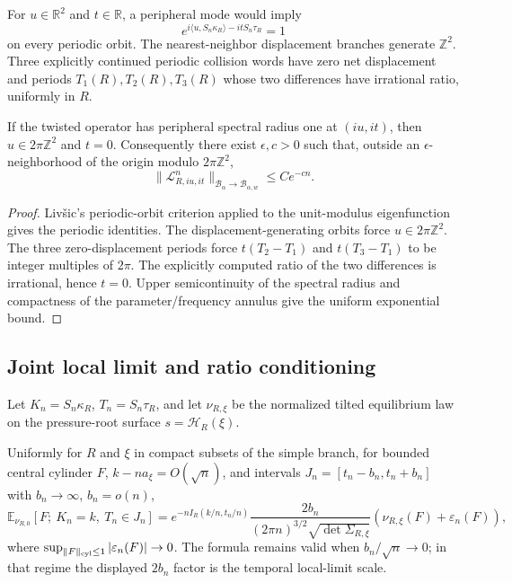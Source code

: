 For \(u\in\mathbb R^2\) and \(t\in\mathbb R\), a peripheral mode would imply
\[
 e^{i\langle u,S_n\kappa_R\rangle-itS_n\tau_R}=1
\]
on every periodic orbit.  The nearest-neighbor displacement branches generate
\(\mathbb Z^2\).  Three explicitly continued periodic collision words have
zero net displacement and periods \(T_1(R),T_2(R),T_3(R)\) whose two
differences have irrational ratio, uniformly in \(R\).

\begin{lemma}
\label{lem:rr2-a2-aperiodic}
If the twisted operator has peripheral spectral radius one at \((iu,it)\),
then \(u\in2\pi\mathbb Z^2\) and \(t=0\).  Consequently there exist
\(\epsilon,c>0\) such that, outside an \(\epsilon\)-neighborhood of the
origin modulo \(2\pi\mathbb Z^2\),
\[
 \|\mathcal L_{R,iu,it}^n\|_{\mathcal B_\alpha\to\mathcal B_{\alpha,w}}
 \le Ce^{-cn}.
\]
\end{lemma}

\begin{proof}
Liv\v{s}ic's periodic-orbit criterion applied to the unit-modulus
eigenfunction gives the periodic identities.  The displacement-generating
orbits force \(u\in2\pi\mathbb Z^2\).  The three zero-displacement periods
force \(t(T_2-T_1)\) and \(t(T_3-T_1)\) to be integer multiples of \(2\pi\).
The explicitly computed ratio of the two differences is irrational, hence
\(t=0\).  Upper semicontinuity of the spectral radius and compactness of the
parameter/frequency annulus give the uniform exponential bound.
\end{proof}

\subsection{Joint local limit and ratio conditioning}

Let \(K_n=S_n\kappa_R\), \(T_n=S_n\tau_R\), and let
\(\nu_{R,\xi}\) be the normalized tilted equilibrium law on the pressure-root
surface \(s=\mathcal H_R(\xi)\).

\begin{theorem}
\label{thm:rr2-a2-jllt}
Uniformly for \(R\) and \(\xi\) in compact subsets of the simple branch, for
bounded central cylinder \(F\), \(k-na_\xi=O(\sqrt n)\), and intervals
\(J_n=[t_n-b_n,t_n+b_n]\) with \(b_n\to\infty\), \(b_n=o(n)\),
\[
 \mathbb E_{\nu_{R,0}}\!\left[
 F;\ K_n=k,\ T_n\in J_n\right]
 =
 e^{-nI_R(k/n,t_n/n)}
 \frac{2b_n}{(2\pi n)^{3/2}\sqrt{\det\Sigma_{R,\xi}}}
 \left(\nu_{R,\xi}(F)+\varepsilon_n(F)\right),
\]
where \(\sup_{\|F\|_{\rm cyl}\le1}|\varepsilon_n(F)|\to0\).
The formula remains valid when \(b_n/\sqrt n\to0\); in that regime the
displayed \(2b_n\) factor is the temporal local-limit scale.
\end{theorem}

